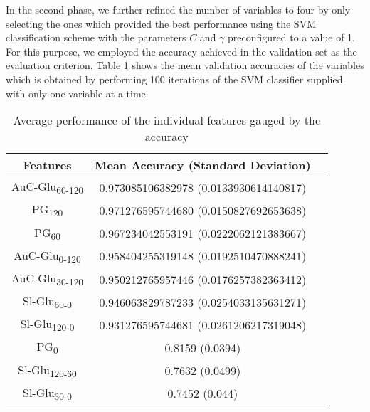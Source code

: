 \documentclass[journal,comsoc]{IEEEtran}
\renewcommand{\^}{\hat}  %
\begin{document}
In the second phase, we further refined the number of variables to four by only selecting the ones which provided the best performance using the SVM classification scheme with the parameters $C$ and $\gamma$ preconfigured to a value of \num{1}. For this purpose, we employed the accuracy achieved in the validation set as the evaluation criterion. Table \ref{tab:best_features} shows the mean validation accuracies of the variables which is  obtained by performing \num{100} iterations of the SVM classifier supplied with only one variable at a time.
%
\begin{table}[!htbp]
  \caption{Average performance of the individual features gauged by the accuracy}
  \centering
  \begin{tabular}{c c c}
    \toprule
    Features &  Mean Accuracy (Standard Deviation)\\
    \midrule \midrule
    \rowcolor{green!25} AuC-Glu\textsubscript{60-120}	& \num{0.973085106382978}	(\num{0.0133930614140817})\\
    \rowcolor{green!25} PG\textsubscript{120}	& \num{0.971276595744680}	(\num{0.0150827692653638})\\
    \rowcolor{green!25} PG\textsubscript{60}	& \num{0.967234042553191}	(\num{0.0222062121383667})\\
    \rowcolor{green!25} AuC-Glu\textsubscript{0-120}	& \num{0.958404255319148}	(\num{0.0192510470888241})\\
    AuC-Glu\textsubscript{30-120}	& \num{0.950212765957446}	(\num{0.0176257382363412}) \\
    Sl-Glu\textsubscript{60-0}	& \num{0.946063829787233}	(\num{0.0254033135631271})\\
    Sl-Glu\textsubscript{120-0}	& \num{0.931276595744681}	(\num{0.0261206217319048})\\
    PG\textsubscript{0}	& \num{0.8159}	(\num{0.0394})\\
    Sl-Glu\textsubscript{120-60}	& \num{0.7632}	(\num{0.0499})\\
    Sl-Glu\textsubscript{30-0}	& \num{0.7452}	(\num{0.044})\\
    \bottomrule
  \end{tabular}
  \label{tab:best_features}
\end{table}
%
\end{document}

